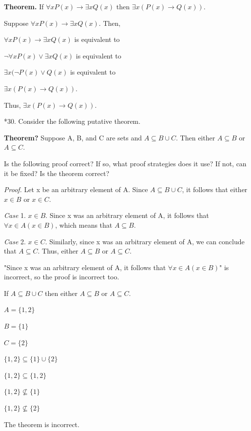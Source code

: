 \documentclass{article}
\begin{document}
\textbf{Theorem.} If $\forall x P(x) \to \exists x Q(x)$ then $\exists x(P(x) \to Q(x))$.

Suppose $\forall x P(x) \to \exists x Q(x)$. Then,

$\forall x P(x) \to \exists x Q(x)$ is equivalent to

$\neg \forall x P(x) \lor \exists x Q(x)$ is equivalent to

$\exists x (\neg P(x) \lor Q(x)$ is equivalent to

$\exists x (P(x) \to Q(x))$.

Thus, $\exists x (P(x) \to Q(x))$.

\vspace{30pt}

*30. Consider the following putative theorem.

\textbf{Theorem?} Suppose A, B, and C are sets and $A \subseteq B \cup C$. Then either
$A \subseteq B$ or $A \subseteq C$.

Is the following proof correct? If so, what proof strategies does it use?
If not, can it be fixed? Is the theorem correct?

\textit{Proof.} Let x be an arbitrary element of A. Since $A \subseteq B \cup C$, it follows
that either $x \in B$ or $x \in C$.

\textit{Case} 1. $x \in B$. Since x was an arbitrary element of A, it follows that
$\forall x \in A(x \in B)$, which means that $A \subseteq B$.

\textit{Case} 2. $x \in C$. Similarly, since x was an arbitrary element of A, we
can conclude that $A \subseteq C$.
Thus, either $A \subseteq B$ or $A \subseteq C$.

\vspace{30pt}

"Since x was an arbitrary element of A, it follows that $\forall x \in A(x \in B)$" is incorrect, so the proof is incorrect too.

If $A \subseteq B \cup C$ then either $A \subseteq B$ or $A \subseteq C$.

$A =\{1,2\}$

$B = \{1\}$

$C = \{2\}$

$\{1,2\} \subseteq \{1\} \cup \{2\}$

$\{1,2\} \subseteq \{1,2\}$

$\{1,2\} \nsubseteq \{1\}$

$\{1,2\} \nsubseteq \{2\}$

The theorem is incorrect.
\end{document}
